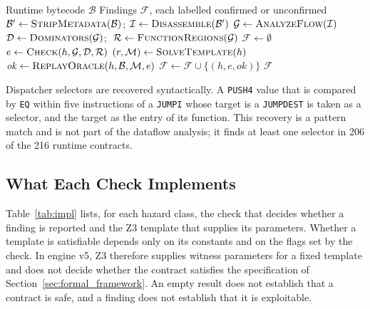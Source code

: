 \documentclass[pdflatex,sn-mathphys]{sn-jnl}
\theoremstyle{thmstyletwo}
\theoremstyle{thmstyletwo}
\begin{document}
\begin{algorithm}[t]
\caption{Triage pipeline of engine v5}
\label{alg:verification}
\begin{algorithmic}[1]
\Require Runtime bytecode $\mathcal{B}$
\Ensure Findings $\mathcal{F}$, each labelled confirmed or unconfirmed
\State $\mathcal{B}' \gets \Call{StripMetadata}{\mathcal{B}}$; $\mathcal{I} \gets \Call{Disassemble}{\mathcal{B}'}$
\State $\mathcal{G} \gets \Call{AnalyzeFlow}{\mathcal{I}}$ 
\State $\mathcal{D} \gets \Call{Dominators}{\mathcal{G}}$; $\;\mathcal{R} \gets \Call{FunctionRegions}{\mathcal{G}}$
\State $\mathcal{F} \gets \emptyset$
    \State $e \gets \Call{Check}{h, \mathcal{G}, \mathcal{D}, \mathcal{R}}$ 
        \State $(r, \mathcal{M}) \gets \Call{SolveTemplate}{h}$
            \State $\mathit{ok} \gets \Call{ReplayOracle}{h, \mathcal{B}, \mathcal{M}, e}$
            \State $\mathcal{F} \gets \mathcal{F} \cup \{(h, e, \mathit{ok})\}$
        \EndIf
    \EndIf
\EndFor
\State \Return $\mathcal{F}$ 
\end{algorithmic}
\end{algorithm}

Dispatcher selectors are recovered syntactically. A \texttt{PUSH4} value that is compared by \texttt{EQ} within five instructions of a \texttt{JUMPI} whose target is a \texttt{JUMPDEST} is taken as a selector, and the target as the entry of its function. This recovery is a pattern match and is not part of the dataflow analysis; it finds at least one selector in 206 of the 216 runtime contracts.

\subsection{What Each Check Implements}\label{sec:arch:scope}
Table~\ref{tab:impl} lists, for each hazard class, the check that decides whether a finding is reported and the Z3 template that supplies its parameters. Whether a template is satisfiable depends only on its constants and on the flags set by the check. In engine v5, Z3 therefore supplies witness parameters for a fixed template and does not decide whether the contract satisfies the specification of Section~\ref{sec:formal_framework}. An empty result does not establish that a contract is safe, and a finding does not establish that it is exploitable.
\end{document}
